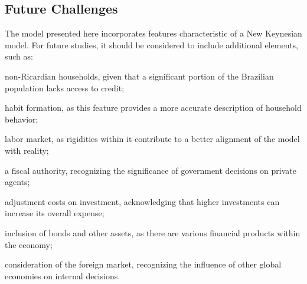 \documentclass[../thesis.tex]{subfiles}
\begin{document}
\subsection{Future Challenges}

The model presented here incorporates features characteristic of a New Keynesian model. For future studies, it should be considered to include additional elements, such as:
\begin{enumerate*}[label=(\arabic*)]
	\item non-Ricardian households, given that a significant portion of the Brazilian population lacks access to credit; 
	\item habit formation, as this feature provides a more accurate description of household behavior;
	\item labor market, as rigidities within it contribute to a better alignment of the model with reality;
	\item a fiscal authority, recognizing the significance of government decisions on private agents;
	\item adjustment costs on investment, acknowledging that higher investments can increase its overall expense;
	\item inclusion of bonds and other assets, as there are various financial products within the economy;
	\item consideration of the foreign market, recognizing the influence of other global economies on internal decisions.
\end{enumerate*}

 
\end{document}
